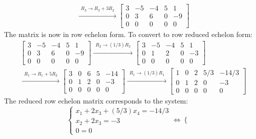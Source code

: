 \documentclass{article}
\begin{document}
\begin{itemize}
\begin{align*}
& \xrightarrow{\begin{array}{c}R_3 \rightarrow R_3 + 3R_2 \end{array}} 
\left[\begin{array}{cccc|c}
3 & -5 & -4 & 5 & 1 \\
0 & 3 & 6 & 0 & -9 \\
0 & 0 & 0 & 0 & 0
\end{array}\right]
\end{align*}
The matrix is now in row echelon form. To convert to row reduced echelon form: 
\begin{align*}
& \left[\begin{array}{cccc|c}
3 & -5 & -4 & 5 & 1 \\
0 & 3 & 6 & 0 & -9 \\
0 & 0 & 0 & 0 & 0
\end{array}\right]
\xrightarrow{\begin{array}{c} R_2 \rightarrow (1/3)R_2 \end{array}} 
\left[\begin{array}{cccc|c}
3 & -5 & -4 & 5 & 1 \\
0 & 1 & 2 & 0 & -3 \\
0 & 0 & 0 & 0 & 0
\end{array}\right] \\
& \xrightarrow{\begin{array}{c} R_1 \rightarrow R_1 + 5R_2 \end{array}} 
\left[\begin{array}{cccc|c}
3 & 0 & 6 & 5 & -14 \\
0 & 1 & 2 & 0 & -3 \\
0 & 0 & 0 & 0 & 0
\end{array}\right]
\xrightarrow{\begin{array}{c} R_1 \rightarrow (1/3)R_1 \end{array}} 
\left[\begin{array}{cccc|c}
1 & 0 & 2 & 5/3 & -14/3 \\
0 & 1 & 2 & 0 & -3 \\
0 & 0 & 0 & 0 & 0
\end{array}\right]
\end{align*}
The reduced row echelon matrix corresponds to the system:
\[\left\{\begin{array}{c}
x_1 + 2x_3 + (5/3)x_4 = -14/3 \\
x_2 + 2x_3 = -3 \\
0 = 0
\end{array}\right.
\iff 
\left\{\begin{array}{c}

\end{array}\]
\end{itemize}
\end{document}
